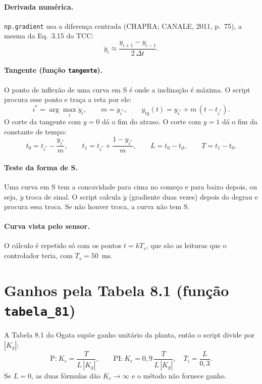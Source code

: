 \documentclass[11pt,a4paper]{article}
\newcommand{\cod}[1]{\texttt{\color{black!75}#1}}
\begin{document}
\paragraph{Derivada numérica.} \cod{np.gradient} usa a diferença centrada (CHAPRA; CANALE, 2011,
p.~75), a mesma da Eq.~3.15 do TCC:
\begin{equation}
  \dot y_i \approx \frac{y_{i+1} - y_{i-1}}{2\,\Delta t}.
\end{equation}

\paragraph{Tangente (função \cod{tangente}).} O ponto de inflexão de uma curva em S é onde a
inclinação é máxima. O script procura esse ponto e traça a reta por ele:
\begin{equation}
  i^* = \arg\max_i \dot y_i,\qquad m = \dot y_{i^*},\qquad
  y_{\text{tg}}(t) = y_{i^*} + m\,(t - t_{i^*}).
\end{equation}
O corte da tangente com $y = 0$ dá o fim do atraso. O corte com $y = 1$ dá o fim da constante
de tempo:
\begin{equation}
  t_0 = t_{i^*} - \frac{y_{i^*}}{m},\qquad t_1 = t_{i^*} + \frac{1 - y_{i^*}}{m},
  \qquad L = t_0 - t_d,\qquad T = t_1 - t_0 .
\end{equation}

\paragraph{Teste da forma de S.} Uma curva em S tem a concavidade para cima no começo e para
baixo depois, ou seja, $\ddot y$ troca de sinal. O script calcula $\ddot y$ (gradiente duas
vezes) depois do degrau e procura essa troca. Se não houver troca, a curva não tem S.

\paragraph{Curva vista pelo sensor.} O cálculo é repetido só com os pontos $t = kT_s$, que são
as leituras que o controlador teria, com $T_s = 50$~ms.

\section{Ganhos pela Tabela 8.1 (função \cod{tabela\_81})}

A Tabela 8.1 do Ogata supõe ganho unitário da planta, então o script divide por $|K_g|$:
\begin{equation}
  \text{P:}\ K_c = \frac{T}{L\,|K_g|},\qquad
  \text{PI:}\ K_c = 0{,}9\,\frac{T}{L\,|K_g|},\quad T_i = \frac{L}{0{,}3}.
\end{equation}
Se $L = 0$, as duas fórmulas dão $K_c \to \infty$ e o método não fornece ganho.
\end{document}
